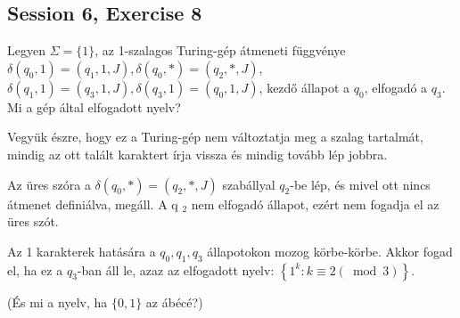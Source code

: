 \subsection{Session 6, Exercise 8}


Legyen $\Sigma=\{1\}$, az 1-szalagos Turing-gép átmeneti függvénye $\delta\left(q_{0}, 1\right)=\left(q_{1}, 1, J\right), \delta\left(q_{0}, *\right)=\left(q_{2}, *, J\right)$, $\delta\left(q_{1}, 1\right)=\left(q_{3}, 1, J\right), \delta\left(q_{3}, 1\right)=\left(q_{0}, 1, J\right)$, kezdő állapot a $q_{0}$, elfogadó a $q_{3}$. Mi a gép által elfogadott nyelv?


Vegyük észre, hogy ez a Turing-gép nem változtatja meg a szalag tartalmát, mindig az ott talált karaktert írja vissza és mindig tovább lép jobbra.

Az üres szóra a $\delta\left(q_{0}, *\right)=\left(q_{2}, *, J\right)$ szabállyal $q_{2}$-be lép, és mivel ott nincs átmenet definiálva, megáll. A q ${ }_{2}$ nem elfogadó állapot, ezért nem fogadja el az üres szót.

Az 1 karakterek hatására a $q_{0}, q_{1}, q_{3}$ állapotokon mozog körbe-körbe. Akkor fogad el, ha ez a $q_{3}$-ban áll le, azaz az elfogadott nyelv: $\left\{1^{k}: k \equiv 2(\bmod 3)\right\}$.

(És mi a nyelv, ha $\{0,1\}$ az ábécé?)